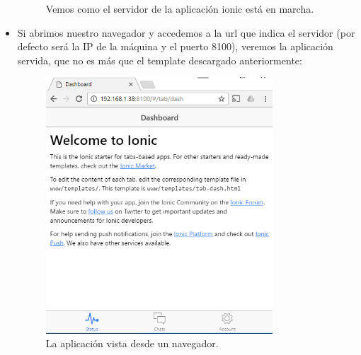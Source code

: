 \begin{itemize}
\begin{figure}[H]
    \caption{Vemos como el servidor de la aplicación ionic está en marcha.}
  \end{figure}
  \item Si abrimos nuestro navegador y accedemos a la url que indica el servidor (por defecto será la IP de la máquina y el puerto 8100), veremos la aplicación servida, que no es más que el template descargado anteriormente:
  \begin{figure}[H]
\centering
    \includegraphics[width=0.8\textwidth]{Figures/anexo/anexoI/ionic/its_alive}
    \caption{La aplicación vista desde un navegador.}
  \end{figure}
\end{itemize}
